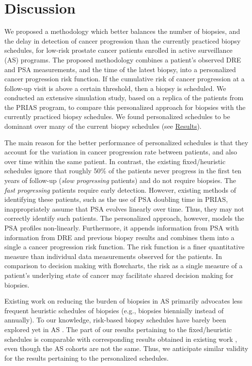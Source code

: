 \section{Discussion}
\label{sec:discussion}
We proposed a methodology which better balances the number of biopsies, and the delay in detection of cancer progression than the currently practiced biopsy schedules, for low-risk prostate cancer patients enrolled in active surveillance (AS) programs. The proposed methodology combines a patient's observed DRE and PSA measurements, and the time of the latest biopsy, into a personalized cancer progression risk function. If the cumulative risk of cancer progression at a follow-up visit is above a certain threshold, then a biopsy is scheduled. We conducted an extensive simulation study, based on a replica of the patients from the PRIAS program, to compare this personalized approach for biopsies with the currently practiced biopsy schedules. We found personalized schedules to be dominant over many of the current biopsy schedules (see \hyperref[sec:results]{Results}).

The main reason for the better performance of personalized schedules is that they account for the variation in cancer progression rate between patients, and also over time within the same patient. In contrast, the existing fixed/heuristic schedules ignore that roughly 50\% of the patients never progress in the first ten years of follow-up (\textit{slow progressing} patients) and do not require biopsies. The \textit{fast progressing} patients require early detection. However, existing methods of identifying these patients, such as the use of PSA doubling time in PRIAS, inappropriately assume that PSA evolves linearly over time. Thus, they may not correctly identify such patients. The personalized approach, however, models the PSA profiles non-linearly. Furthermore, it appends information from PSA with information from DRE and previous biopsy results and combines them into a single a cancer progression risk function. The risk function is a finer quantitative measure than individual data measurements observed for the patients. In comparison to decision making with flowcharts, the risk as a single measure of a patient's underlying state of cancer may facilitate shared decision making for biopsies.

Existing work on reducing the burden of biopsies in AS primarily advocates less frequent heuristic schedules of biopsies \citep{inoue2018comparative} (e.g., biopsies biennially instead of annually). To our knowledge, risk-based biopsy schedules have barely been explored yet in AS \cite{nieboer2018active,bruinsma2016active}. The part of our results pertaining to the fixed/heuristic schedules is comparable with corresponding results obtained in existing work \cite{inoue2018comparative}, even though the AS cohorts are not the same. Thus, we anticipate similar validity for the results pertaining to the personalized schedules.

